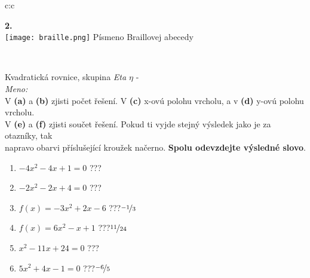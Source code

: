 \documentclass[10pt]{report}
\begin{document}
\begin{tabular}{c:c}
\begin{minipage}[c][99mm][t]{0.49\linewidth}
\begin{center}
\begin{minipage}{0.20\linewidth}
\begin{center}
{\Huge\bfseries 2.} \\[2mm]
\texttt{[image: braille.png]}
{\small Písmeno Braillovej abecedy}
\end{center}
\end{minipage}
\end{center}
\end{minipage}
\\ \hdashline
\begin{minipage}[c][99mm][t]{0.49\linewidth}
\begin{center}
\vspace{7mm}
{\huge Kvadratická rovnice, skupina \textit{Eta $\eta$} -}\\[4.5mm]
\textit{Meno:}\phantom{xxxxxxxxxxxxxxxxxxxxxxxxxxxxxxxxxxxxxxxxxxxxxxxxxxxxxxxxxxxxxxxxx}\\[3.5mm]
V \textbf{(a)} a \textbf{(b)} zjisti počet řešení. V \textbf{(c)} x-ovú polohu vrcholu, a v \textbf{(d)} y-ovú polohu vrcholu.\\V \textbf{(e)} a \textbf{(f)} zjisti součet řešení. Pokud ti vyjde stejný výsledek jako je za otazníky, tak\\napravo obarvi příslušející kroužek načerno. \textbf{Spolu odevzdejte výsledné slovo}.\\[3mm]
\begin{minipage}{0.77\linewidth}
\begin{center}
\begin{varwidth}{\textwidth}
\begin{enumerate}
\large
\item $-4x^2-4x+1=0$\quad \dotfill\; ???\;\dotfill {}
\item $-2x^2-2x+4=0$\quad \dotfill\; ???\;\dotfill {}
\item $f(x)=-3x^2+2x-6$\quad \dotfill\; ???\;\dotfill \quad $\nicefrac{-1}{3}$
\item $f(x)=6x^2-x+1$\quad \dotfill\; ???\;\dotfill \quad $\nicefrac{11}{24}$
\item $x^2-11x+24=0$\quad \dotfill\; ???\;\dotfill {}
\item $5x^2+4x-1=0$\quad \dotfill\; ???\;\dotfill \quad $\nicefrac{-6}{5}$
\end{enumerate}
\end{varwidth}
\end{center}
\end{minipage}
\begin{minipage}{0.20\linewidth}
\begin{center}

\end{center}
\end{minipage}
\end{center}
\end{minipage}
\end{tabular}
\end{document}
